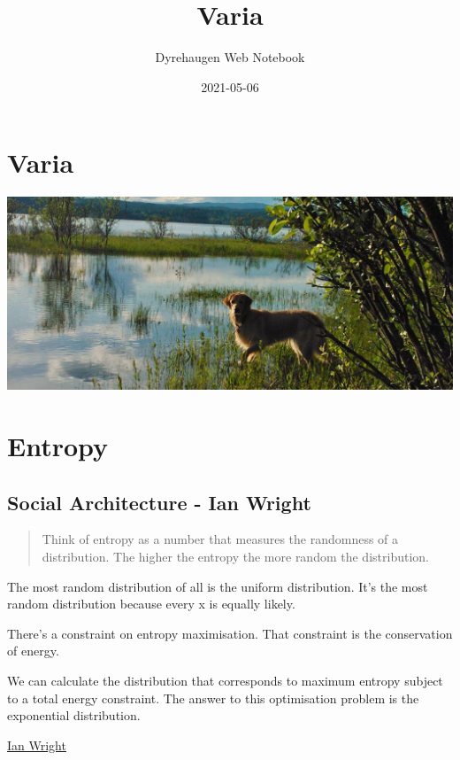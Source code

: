 \documentclass[
]{book}
\title{Varia}
\author{Dyrehaugen Web Notebook}
\date{2021-05-06}
\begin{document}
\maketitle

{
\setcounter{tocdepth}{1}
\tableofcontents
}
\hypertarget{varia}{%
\chapter{Varia}\label{varia}}

\includegraphics{fig/zelda.jpg}

\hypertarget{entropy}{%
\chapter{Entropy}\label{entropy}}

\hypertarget{social-architecture---ian-wright}{%
\section{Social Architecture - Ian Wright}\label{social-architecture---ian-wright}}

\begin{quote}
Think of entropy as a number that measures the randomness of a distribution.
The higher the entropy the more random the distribution.
\end{quote}

The most random distribution of all is the uniform distribution.
It's the most random distribution because every x is equally likely.

There's a constraint on entropy maximisation.
That constraint is the conservation of energy.

We can calculate the distribution that corresponds
to maximum entropy subject to a total energy constraint.
The answer to this optimisation problem is the exponential distribution.

\href{https://ianwrightsite.wordpress.com/2017/11/16/the-social-architecture-of-capitalism/}{Ian Wright}
\end{document}
